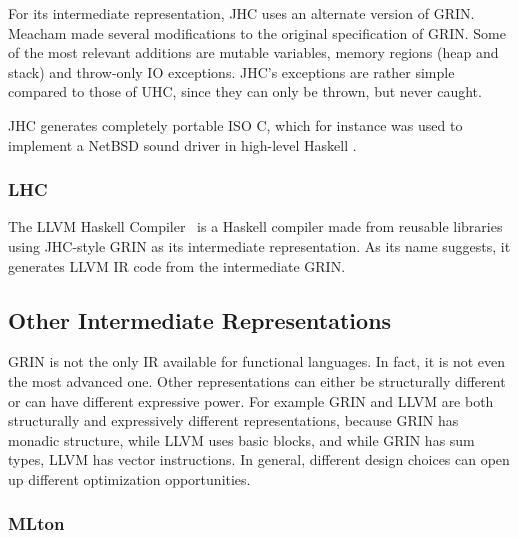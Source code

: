 \documentclass[main.tex]{subfiles}
\begin{document}
	For its intermediate representation, JHC uses an alternate version of GRIN. Meacham made several modifications to the original specification of GRIN. Some of the most relevant additions are mutable variables, memory regions (heap and stack) and throw-only IO exceptions. JHC's exceptions are rather simple compared to those of UHC, since they can only be thrown, but never caught.
	
	JHC generates completely portable ISO C, which for instance was used to implement a NetBSD sound driver in high-level Haskell \cite{ajhc}.
	
	
	
	\subsubsection{LHC}
	
	The LLVM Haskell Compiler~\cite{lhc} is a Haskell compiler made from reusable libraries using JHC-style GRIN as its intermediate representation. As its name suggests, it generates LLVM IR code from the intermediate GRIN.
	
	\subsection{Other Intermediate Representations}
	
	GRIN is not the only IR available for functional languages. In fact, it is not even the most advanced one. Other representations can either be structurally different or can have different expressive power. For example GRIN and LLVM are both structurally and expressively different representations, because GRIN has monadic structure, while LLVM uses basic blocks, and while GRIN has sum types, LLVM has vector instructions. In general, different design choices can open up different optimization opportunities.
	
	\subsubsection{MLton}
	
\end{document}
